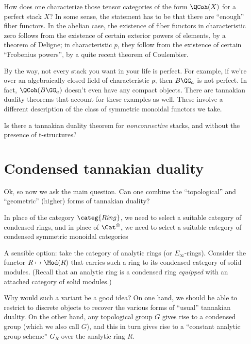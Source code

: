 \documentclass[leqno]{article}
\begin{document}
\begin{qst}
    How does one characterize those tensor categories of the form
    \(\QCoh(X)\) for a perfect stack \(X\)?
    In some sense, the statement has to be that there are
    \enquote{enough} fiber functors.
    In the abelian case, the existence of fiber functors
    in characteristic zero follows from the existence
    of certain exterior powers of elements,
    by a theorem of Deligne;
    in characteristic \(p\), they follow from the existence
    of certain \enquote{Frobenius powers},
    by a quite recent theorem of Coulembier.
\end{qst}

By the way, not every stack you want in your life is perfect.
For example, if we're over an algebraically closed field
of characteristic \(p\), then \(B\GG_a\) is not perfect.
In fact, \(\QCoh(B\GG_a)\) doesn't even have any compact objects.
There are tannakian duality theorems that
account for these examples as well.
These involve a different description of
the class of symmetric monoidal functors we take.

\begin{qst}
    Is there a tannakian duality theorem for \emph{nonconnective}
    stacks, and without the presence of t-structures?
\end{qst}

\section{Condensed tannakian duality}%
\label{condensedtannakian}

Ok, so now we ask the main question.
Can one combine the \enquote{topological} and \enquote{geometric}
(higher) forms of tannakian duality?

In place of the category \(\categ{Ring}\),
we need to select a suitable category of condensed rings,
and in place of \(\Cat^{\otimes}\),
we need to select a suitable category of
condensed symmetric monoidal categories

A sensible option: take the category of
analytic rings (or \(E_{\infty}\)-rings).
Consider the functor \(R \mapsto \Mod(R)\) that
carries such a ring to its condensed category
of solid modules.
(Recall that an analytic ring is a condensed ring
\emph{equipped} with an attached category of solid modules.)

Why would such a variant be a good idea?
On one hand, we should be able to restrict to discrete objects
to recover the various forms of \enquote{usual} tannakian duality.
On the other hand, any topological group \(G\)
gives rise to a condensed group
(which we also call \(G\)),
and this in turn gives rise to a
\enquote{constant analytic group scheme} \(G_R\)
over the analytic ring \(R\).
\end{document}
